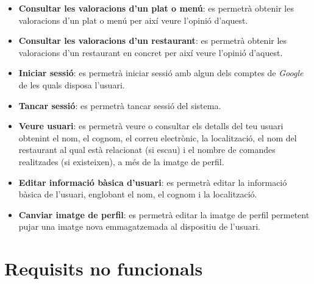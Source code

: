 \begin{itemize}
\item \textbf{Consultar les valoracions d'un plat o menú}: es permetrà obtenir les valoracions d'un plat o menú per així veure l'opinió d'aquest.
\item \textbf{Consultar les valoracions d'un restaurant}: es permetrà obtenir les valoracions d'un restaurant en concret per així veure l'opinió d'aquest.
\item \textbf{Iniciar sessió}: es permetrà iniciar sessió amb algun dels comptes de \textit{Google} de les quals disposa l'usuari.
\item \textbf{Tancar sessió}: es permetrà tancar sessió del sistema.
\item \textbf{Veure usuari}: es permetrà veure o consultar els detalls del teu usuari obtenint el nom, el cognom, el correu electrònic, la localització, el nom del restaurant al qual està relacionat (si escau) i el nombre de comandes realitzades (si existeixen), a més de la imatge de perfil.
\item \textbf{Editar informació bàsica d'usuari}: es permetrà editar la informació bàsica de l'usuari, englobant el nom, el cognom i la localització.
\item \textbf{Canviar imatge de perfil}: es permetrà editar la imatge de perfil permetent pujar una imatge nova emmagatzemada al dispositiu de l'usuari.
\end{itemize}
\newpage


\section{Requisits no funcionals}

